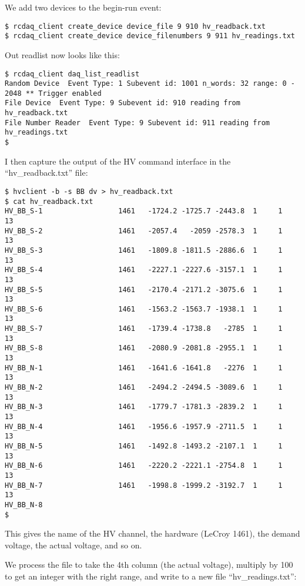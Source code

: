 \documentclass{article}[11pt]
\begin{document}
We add two devices to the begin-run event:
\begin{verbatim}
$ rcdaq_client create_device device_file 9 910 hv_readback.txt 
$ rcdaq_client create_device device_filenumbers 9 911 hv_readings.txt
\end{verbatim}

Out readlist now looks like this:

\begin{verbatim}
$ rcdaq_client daq_list_readlist
Random Device  Event Type: 1 Subevent id: 1001 n_words: 32 range: 0 - 2048 ** Trigger enabled
File Device  Event Type: 9 Subevent id: 910 reading from  hv_readback.txt
File Number Reader  Event Type: 9 Subevent id: 911 reading from  hv_readings.txt
$ 
\end{verbatim}


I then capture the output of the HV command interface in the
``hv\_readback.txt'' file:

\begin{verbatim}
$ hvclient -b -s BB dv > hv_readback.txt
$ cat hv_readback.txt
HV_BB_S-1                  1461   -1724.2 -1725.7 -2443.8  1     1    13
HV_BB_S-2                  1461   -2057.4   -2059 -2578.3  1     1    13
HV_BB_S-3                  1461   -1809.8 -1811.5 -2886.6  1     1    13
HV_BB_S-4                  1461   -2227.1 -2227.6 -3157.1  1     1    13
HV_BB_S-5                  1461   -2170.4 -2171.2 -3075.6  1     1    13
HV_BB_S-6                  1461   -1563.2 -1563.7 -1938.1  1     1    13
HV_BB_S-7                  1461   -1739.4 -1738.8   -2785  1     1    13
HV_BB_S-8                  1461   -2080.9 -2081.8 -2955.1  1     1    13
HV_BB_N-1                  1461   -1641.6 -1641.8   -2276  1     1    13
HV_BB_N-2                  1461   -2494.2 -2494.5 -3089.6  1     1    13
HV_BB_N-3                  1461   -1779.7 -1781.3 -2839.2  1     1    13
HV_BB_N-4                  1461   -1956.6 -1957.9 -2711.5  1     1    13
HV_BB_N-5                  1461   -1492.8 -1493.2 -2107.1  1     1    13
HV_BB_N-6                  1461   -2220.2 -2221.1 -2754.8  1     1    13
HV_BB_N-7                  1461   -1998.8 -1999.2 -3192.7  1     1    13
HV_BB_N-8     
$
\end{verbatim}

This gives the name of the HV channel, the hardware (LeCroy 1461), the
demand voltage, the actual voltage, and so on.

We process the file to take the 4th column (the actual voltage),
multiply by 100 to get an integer with the right range, and write to a
new file ``hv\_readings.txt'':
\end{document}
